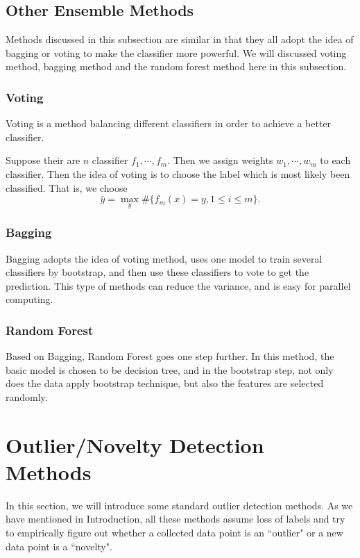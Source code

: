 \documentclass[english]{article}
\begin{document}
\subsection{Other Ensemble Methods}
\par Methods discussed in this subsection are similar in that they all adopt the idea of bagging or voting to make the classifier more powerful. We will discussed voting method, bagging method and the random forest method here in this subsection.

\subsubsection{Voting}
\par Voting is a method balancing different classifiers in order to achieve a better classifier.
\par Suppose their are $n$ classifier $f_{1}, \cdots, f_{m}$. Then we assign weights $w_{1}, \cdots, w_{m}$ to each classifier. Then the idea of voting is to choose the label which is most likely been classified. That is, we choose 
\begin{equation}
	\hat{y} = \max_{y}\#\{f_{m}(x) = y, 1\le i\le m\}.
\end{equation}

\subsubsection{Bagging}
\par Bagging adopts the idea of voting method, uses one model to train several classifiers by bootstrap, and then use these classifiers to vote to get the prediction. This type of methods can reduce the variance, and is easy for parallel computing.

\subsubsection{Random Forest}
\par Based on Bagging, Random Forest goes one step further. In this method, the basic model is chosen to be decision tree, and in the bootstrap step, not only does the data apply bootstrap technique, but also the features are selected randomly.

\section{Outlier/Novelty Detection Methods}

\par
In this section, we will introduce some standard outlier detection methods. As we have mentioned in Introduction, all these methods assume loss of labels and try to empirically figure out whether a collected data point is an ``outlier" or a new data point is a ``novelty". 
\end{document}
